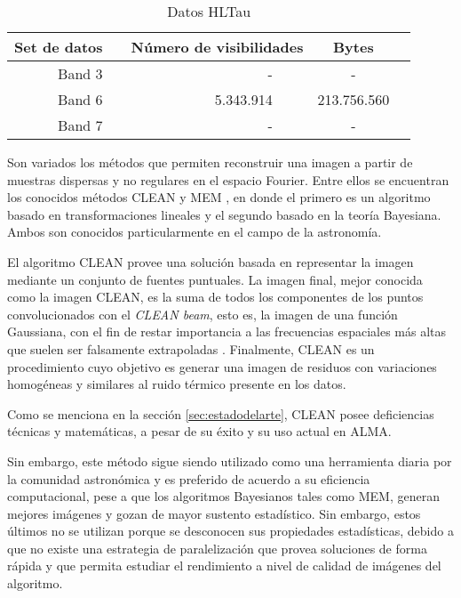 \newcommand{\ra}[1]{\renewcommand{\arraystretch}{#1}}
\begin{table}[h!]
\centering
\ra{1.2}
\caption{Datos HLTau}
\label{tab:data}
\begin{tabular}{@{}rcrrcr@{}}
\toprule
 \multicolumn{1}{c}{{\bf Set de datos}} & \phantom{a} & \multicolumn{2}{c}{{\bf Número de visibilidades}}  & \multicolumn{1}{c}{{\bf Bytes}} \\
 \midrule
 Band 3   && - &&  -\\
 Band 6   && 5.343.914 &&  213.756.560\\
 Band 7   && - &&  -\\
 \toprule
\end{tabular}
\end{table}


Son variados los métodos que permiten reconstruir una imagen a partir de muestras dispersas y no regulares en el espacio Fourier. Entre ellos se encuentran los conocidos métodos CLEAN \citep{CLEAN} y MEM \citep{MEM}, en donde el primero es un algoritmo basado en transformaciones lineales y el segundo basado en la teoría Bayesiana. Ambos son conocidos particularmente en el campo de la astronomía.


El algoritmo CLEAN provee una solución basada en representar la imagen mediante un conjunto de fuentes puntuales. La imagen final, mejor conocida como la imagen CLEAN, es la suma de todos los componentes de los puntos convolucionados con el \textit{CLEAN beam}, esto es, la imagen de una función Gaussiana, con el fin de restar importancia a las frecuencias espaciales más altas que suelen ser falsamente extrapoladas \citep{libroAstro2}. Finalmente, CLEAN es un procedimiento cuyo objetivo es generar una imagen de residuos con variaciones homogéneas y similares al ruido térmico presente en los datos.

Como se menciona en la sección \ref{sec:estadodelarte}, CLEAN posee deficiencias técnicas y matemáticas, a pesar de su éxito y su uso actual en ALMA.

Sin embargo, este método sigue siendo utilizado como una herramienta diaria por la comunidad astronómica y es preferido de acuerdo a su eficiencia computacional, pese a que los algoritmos Bayesianos tales como MEM, generan mejores imágenes y gozan de mayor sustento estadístico. Sin embargo, estos últimos no se utilizan porque se desconocen sus propiedades estadísticas, debido a que no existe una estrategia de paralelización que provea soluciones de forma rápida y que permita estudiar el rendimiento a nivel de calidad de imágenes del algoritmo.

